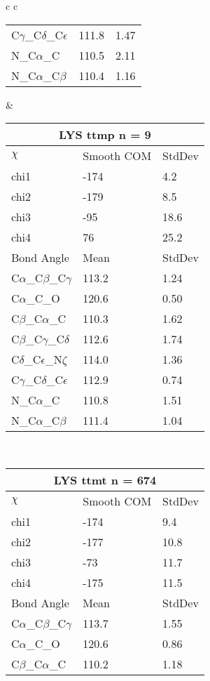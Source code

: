 \begin{longtable}{ c c }
\begin{tabular}{ l l l }
  C$\gamma$\_C$\delta$\_C$\epsilon$ & 111.8 & 1.47\\
  N\_C$\alpha$\_C & 110.5 & 2.11\\
  N\_C$\alpha$\_C$\beta$ & 110.4 & 1.16\\
  \bottomrule
  \end{tabular}
  &
  \begin{tabular}{ l l l }
  \toprule
  \multicolumn{3}{c}{LYS \textbf{ttmp} n = 9} \\ \toprule
  $\chi$       & Smooth COM & StdDev \\ \midrule
  chi1 & -174 & 4.2 \\ 
  chi2 & -179 & 8.5 \\ 
  chi3 & -95 & 18.6 \\ 
  chi4 & 76 & 25.2 \\ \midrule
  Bond Angle   & Mean     & StdDev \\ \midrule
  C$\alpha$\_C$\beta$\_C$\gamma$ & 113.2 & 1.24\\
  C$\alpha$\_C\_O & 120.6 & 0.50\\
  C$\beta$\_C$\alpha$\_C & 110.3 & 1.62\\
  C$\beta$\_C$\gamma$\_C$\delta$ & 112.6 & 1.74\\
  C$\delta$\_C$\epsilon$\_N$\zeta$ & 114.0 & 1.36\\
  C$\gamma$\_C$\delta$\_C$\epsilon$ & 112.9 & 0.74\\
  N\_C$\alpha$\_C & 110.8 & 1.51\\
  N\_C$\alpha$\_C$\beta$ & 111.4 & 1.04\\
  \bottomrule
  \end{tabular}
  \\
  \begin{tabular}{ l l l }
  \toprule
  \multicolumn{3}{c}{LYS \textbf{ttmt} n = 674} \\ \toprule
  $\chi$       & Smooth COM & StdDev \\ \midrule
  chi1 & -174 & 9.4 \\ 
  chi2 & -177 & 10.8 \\ 
  chi3 & -73 & 11.7 \\ 
  chi4 & -175 & 11.5 \\ \midrule
  Bond Angle   & Mean     & StdDev \\ \midrule
  C$\alpha$\_C$\beta$\_C$\gamma$ & 113.7 & 1.55\\
  C$\alpha$\_C\_O & 120.6 & 0.86\\
  C$\beta$\_C$\alpha$\_C & 110.2 & 1.18\\

\end{tabular}
\end{longtable}
